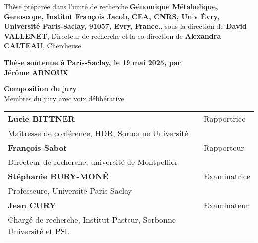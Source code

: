 \begin{titlepage}
\footnotesize Thèse préparée dans l'unité de recherche \textbf{Génomique Métabolique, Genoscope, Institut François Jacob, CEA, CNRS, Univ Évry, Université Paris-Saclay, 91057, Evry, France.}, sous la direction de \textbf{David VALLENET}, Directeur de recherche et la co-direction de \textbf{Alexandra CALTEAU}, Chercheuse\\
\vspace{15mm}

\textbf{Thèse soutenue à Paris-Saclay, le 19 mai 2025, par}\\
\bigskip
\Large {\color{Prune} \textbf{Jérôme ARNOUX}} %

\vspace{\fill} %

\bigskip

\flushleft
\small {\color{Prune} \textbf{Composition du jury}}\\
{\color{Prune} \scriptsize {Membres du jury avec voix délibérative}} \\
\vspace{2mm}
\scriptsize
\begin{tabular}{|p{7cm}l}
\arrayrulecolor{Prune}
\textbf{Lucie BITTNER} &  Rapportrice \\ 
Maîtresse de conférence, HDR, Sorbonne Université   &   \\ 
\textbf{François Sabot} &  Rapporteur \\ 
Directeur de recherche, université de Montpellier  &   \\ 
\textbf{Stéphanie BURY-MONÉ} & Examinatrice\\ 
Professeure, Université Paris Saclay & \\
\textbf{Jean CURY} &  Examinateur \\ 
Chargé de recherche, Institut Pasteur, Sorbonne Université et PSL  &   \\
\end{tabular} 

\end{titlepage}